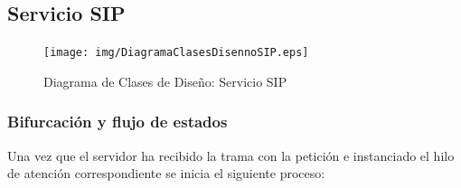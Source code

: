 \documentclass[a4paper,spanish,12pt]{book}
\begin{document}
\subsection{Servicio SIP}
\begin{figure}[h]
		\begin{center}
				\texttt{[image: img/DiagramaClasesDisennoSIP.eps]}	
			\end{center}
			\caption{Diagrama de Clases de Diseño: Servicio SIP}
			  \label{fig:DiagramaClasesDisennoSIP}
\end{figure}
\subsubsection{Bifurcación y flujo de estados} 
Una vez que el servidor ha recibido la trama con la petición e instanciado el hilo de atención correspondiente se inicia el siguiente proceso:
\end{document}
